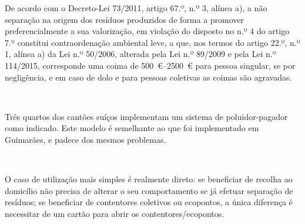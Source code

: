 \documentclass[11pt, a4paper, oneside]{book}
\begin{document}
\begin{appendices}
\noindent{}

De acordo com o Decreto-Lei 73/2011, artigo 67.º, n.º 3, alínea a), a não separação na origem dos resíduos produzidos de forma a promover preferencialmente a sua valorização, em violação do disposto no n.º 4 do artigo 7.º constitui contraordenação ambiental leve, a que, nos termos do artigo 22.º, n.º 1, alínea a) da Lei n.º 50/2006, alterada pela Lei n.º 89/2009 e pela Lei n.º 114/2015, corresponde uma coima de \SIrange{500}{2500}{\euro} para pessoa singular, se por negligência, e em caso de dolo e para pessoas coletivas as coimas são agravadas.

~

\noindent{}

Três quartos dos cantões suíços implementam um sistema de poluidor-pagador como indicado. Este modelo é semelhante ao que foi implementado em Guimarães, e padece dos mesmos problemas.

~

\noindent{}

\noindent{}

O caso de utilização mais simples é realmente direto: se beneficiar de recolha ao domicílio não precisa de alterar o seu comportamento se já efetuar separação de resíduos; se beneficiar de contentores coletivos ou ecopontos, a única diferença é necessitar de um cartão para abrir os contentores/ecopontos.

~

\noindent{}


\end{appendices}
\end{document}
